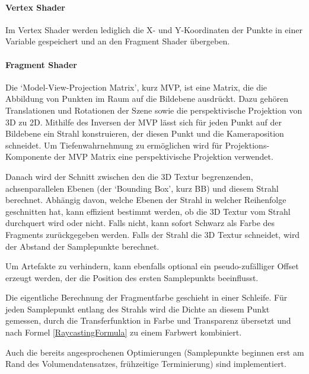 \documentclass[a4paper,fontsize=12pt,toc=bib,halfparskip]{scrartcl}
\begin{document}
\paragraph{Vertex Shader}
Im Vertex Shader werden lediglich die X- und Y-Koordinaten der Punkte in einer Variable gespeichert und an den Fragment Shader \"ubergeben.

\paragraph{Fragment Shader}
Die `Model-View-Projection Matrix', kurz MVP, ist eine Matrix, die die Abbildung von Punkten im Raum auf die Bildebene ausdr\"uckt. Dazu geh\"oren Translationen und Rotationen der Szene sowie die perspektivische Projektion von 3D zu 2D. Mithilfe des Inversen der MVP l\"asst sich f\"ur jeden Punkt auf der Bildebene ein Strahl konstruieren, der diesen Punkt und die Kameraposition schneidet. Um Tiefenwahrnehmung zu erm\"oglichen wird f\"ur Projektions-Komponente der MVP Matrix eine perspektivische Projektion verwendet.

Danach wird der Schnitt zwischen den die 3D Textur begrenzenden, achsenparallelen Ebenen (der `Bounding Box', kurz BB) und diesem Strahl berechnet. Abh\"angig davon, welche Ebenen der Strahl in welcher Reihenfolge geschnitten hat, kann effizient bestimmt werden, ob die 3D Textur vom Strahl durchquert wird oder nicht. Falls nicht, kann sofort Schwarz als Farbe des Fragments zur\"uckgegeben werden. Falls der Strahl die 3D Textur schneidet, wird der Abstand der Samplepunkte berechnet. 

Um Artefakte zu verhindern, kann ebenfalls optional ein pseudo-zuf\"alliger Offset erzeugt werden, der die Position des ersten Samplepunkts beeinflusst.

Die eigentliche Berechnung der Fragmentfarbe geschieht in einer Schleife. F\"ur jeden Samplepunkt entlang des Strahls wird die Dichte an diesem Punkt gemessen, durch die Transferfunktion in Farbe und Transparenz  \"ubersetzt und nach Formel \ref{RaycastingFormula} zu einem Farbwert kombiniert. 

Auch die bereits angesprochenen Optimierungen (Samplepunkte beginnen erst am Rand des Volumendatensatzes, fr\"uhzeitige Terminierung) sind implementiert.
\end{document}
